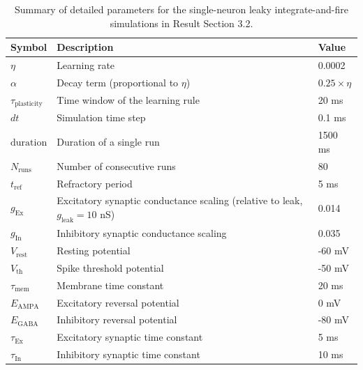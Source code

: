\documentclass[11pt]{article}
\theoremstyle{remark}
\theoremstyle{definition}
\begin{document}
\begin{table}[H]
\centering
\caption{Summary of detailed parameters for the single-neuron leaky integrate-and-fire simulations in Result Section 3.2.}
\label{tab:lif-params}
\begin{tabular}{lll}
\hline
\textbf{Symbol} & \textbf{Description} & \textbf{Value} \\
\hline
$\eta$        & Learning rate & 0.0002 \\
$\alpha$      & Decay term (proportional to $\eta$) & $0.25 \times \eta$ \\
$\tau_{\text{plasticity}}$ & Time window of the learning rule & 20 ms \\
$dt$          & Simulation time step & 0.1 ms \\
$\text{duration}$ & Duration of a single run & 1500 ms \\
$N_{\text{runs}}$ & Number of consecutive runs & 80 \\
$t_{\text{ref}}$  & Refractory period & 5 ms \\
$g_{\text{Ex}}$   & Excitatory synaptic conductance scaling (relative to leak, $g_{\text{leak}}=10$ nS) & 0.014 \\
$g_{\text{In}}$   & Inhibitory synaptic conductance scaling & 0.035 \\
$V_{\text{rest}}$ & Resting potential & -60 mV \\
$V_{\text{th}}$   & Spike threshold potential & -50 mV \\
$\tau_{\text{mem}}$ & Membrane time constant & 20 ms \\
$E_{\text{AMPA}}$ & Excitatory reversal potential & 0 mV \\
$E_{\text{GABA}}$ & Inhibitory reversal potential & -80 mV \\
$\tau_{\text{Ex}}$ & Excitatory synaptic time constant & 5 ms \\
$\tau_{\text{In}}$ & Inhibitory synaptic time constant & 10 ms \\
\hline
\end{tabular}
\end{table}
\end{document}
